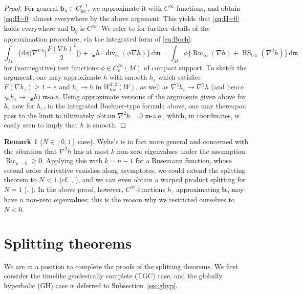 \documentclass[a4paper,11pt]{article}
\numberwithin{equation}{section}
\theoremstyle{definition}
\newtheorem{remark}[definition]{Remark}
\theoremstyle{plain}
\newcommand{\dd}{\mathrm{d}}
\newcommand{\fm}{\ensuremath{\mathfrak{m}}}
\newcommand{\bb}{\ensuremath{\mathbf{b}}}
\def\loc{\mathop{\mathrm{loc}}\nolimits}
\def\div{\mathop{\mathrm{div}}\nolimits}
\def\Ric{\mathop{\mathrm{Ric}}\nolimits}
\def\HS{\mathop{\mathrm{HS}}\nolimits}
\begin{document}
\begin{proof}
For general $\bb_\eta \in C^{1,1}_{\loc}$, we approximate it with $C^\infty$-functions, and obtain \eqref{eq:H=0} almost everywhere by the above argument.
This yields that \eqref{eq:H=0} holds everywhere and $\bb_\eta$ is $C^\infty$.
We refer to \cite[Corollary~14]{quintet} for further details of the approximation procedure, via the integrated form of \eqref{eq:Boch}:
\[ \int_M \biggl\{ \dd\phi \biggl( \nabla^{\nabla h} \biggl[ \frac{F(\nabla h)^2}{2} \biggr] \biggr)
 +\square_\fm h \cdot \div_\fm(\phi \nabla h) \biggr\} \,\dd\fm
 =\int_M \phi \bigl\{ \Ric_\infty (\nabla h) +\HS_{\nabla h}(\nabla^2 h) \bigr\} \,\dd\fm \]
for (nonnegative) test functions $\phi \in C^{\infty}_c(M)$ of compact support. To sketch the argument, one may approximate $h$ with smooth $h_\varepsilon$ which satisfies $F(\nabla h_\varepsilon) \geq 1- \varepsilon$ and $h_\varepsilon \to h$ in $W^{2,2}_{\mathrm{loc}}(W)$, as well as $\nabla^2 h_\varepsilon \to \nabla^2 h$ (and hence $\square_{\mathfrak m} h_\varepsilon \to \square_{\mathfrak m} h$) $\mathfrak m$-a.e. Using approximate versions of the arguments given above for $h$, now for $h_\varepsilon$, in the integrated Bochner-type formula above, one may thereupon pass to the limit to ultimately obtain $\nabla^2h = 0$ $\mathfrak m$-a.e., which, in coordinates, is easily seen to imply that $h$ is smooth. 
\end{proof}

\begin{remark}[{$N \in [0,1]$} case] \label{rm:Wylie}
Wylie's \cite[Lemma~3.1]{Wy} is in fact more general and concerned with the situation that $\nabla^2 h$ has at most $k$ non-zero eigenvalues under the assumption $\Ric_{n-k} \ge 0$.
Applying this with $k=n-1$ for a Busemann function, whose second order derivative vanishes along asymptotes, we could extend the splitting theorem to $N<1$ (cf. \cite[Corollary~1.3]{Wy},  \cite[Theorem~1.5(i)]{WW}), and we can even obtain a warped product splitting for $N=1$ (\cite[Theorem~1.2]{Wy}, \cite[Theorem~1.5(ii)]{WW}).
In the above proof, however, $C^\infty$-functions $h_{\varepsilon}$ approximating $\bb_\eta$ may have $n$ non-zero eigenvalues; this is the reason why we restricted ourselves to $N<0$.
\end{remark}

\section{Splitting theorems}\label{sc:split}

We are in a position to complete the proofs of the splitting theorems.
We first consider the timelike geodesically complete (TGC) case, and the globally hyperbolic (GH) case is deferred to Subsection~\ref{ssc:ghyp}.
\end{document}
